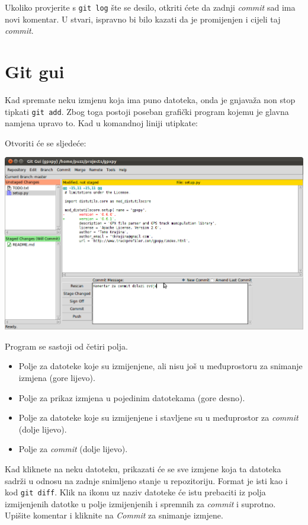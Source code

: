 Ukoliko provjerite s \verb+git log+ šte se desilo, otkriti ćete da zadnji \emph{commit} sad ima novi komentar.
U stvari, ispravno bi bilo kazati da je promijenjen i cijeli taj \emph{commit}.

\section*{Git gui}

Kad spremate neku izmjenu koja ima puno datoteka, onda je gnjavaža non stop tipkati \verb+git add+.
Zbog toga postoji poseban grafički program kojemu je glavna namjena upravo to.
Kad u komandnoj liniji utipkate:


Otvoriti će se sljedeće:

\includegraphics[width=14cm]{images/git-gui.png}

Program se sastoji od četiri polja. 

\begin{itemize}
	\item Polje za datoteke koje su izmijenjene, ali nisu još u međuprostoru za snimanje izmjena (gore lijevo).
	\item Polje za prikaz izmjena u pojedinim datotekama (gore desno). 
	\item Polje za datoteke koje su izmijenjene i stavljene su u međuprostor za \emph{commit} (dolje lijevo).
	\item Polje za \emph{commit} (dolje lijevo).
\end{itemize}

Kad kliknete na neku datoteku, prikazati će se sve izmjene koja ta datoteka sadrži u odnosu na zadnje snimljeno stanje u repozitoriju.
Format je isti kao i kod \verb+git diff+.
Klik na ikonu uz naziv datoteke će istu prebaciti iz polja izmijenjenih datotke u polje izmijenjenih i spremnih za \emph{commit} i suprotno.
Upišite komentar i kliknite na \emph{Commit} za snimanje izmjene.

